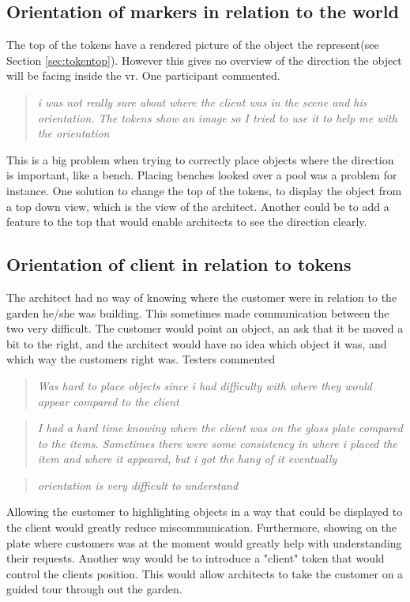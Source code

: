 \subsection*{Orientation of markers in relation to the world}
The top of the tokens have a rendered picture of the object the represent(see Section \ref{sec:tokentop}). However this gives no overview of the direction the object will be facing inside the vr. One participant commented.  
\\
\begin{quote}
\textit{i was not really sure about where the client was in the scene and his orientation. The tokens show an image so I tried to use it to help me with the orientation\\}
\end{quote}
This is a big problem when trying to correctly place objects where the direction is important, like a bench. Placing benches looked over a pool was a problem for instance. One solution to change the top of the tokens, to display the object from a top down view, which is the view of the architect. Another could be to add a feature to the top that would enable architects to see the direction clearly.

\subsection*{Orientation of client in relation to tokens}
The architect had no way of knowing where the customer were in relation to the garden he/she was building. This sometimes made communication between the two very difficult. The customer would point an object, an ask that it be moved a bit to the right, and the architect would have no idea which object it was, and which way the customers right was. Testers commented\\
\begin{quote}
	\textit{Was hard to place objects since i had difficulty with where they would appear compared to the client\\}
\end{quote}

\begin{quote}
	\textit{I had a hard time knowing where the client was on the glass plate compared to the items. Sometimes there were some consistency in where i placed the item and where it appeared, but i got the hang of it eventually\\}
\end{quote}

\begin{quote}
	\textit{orientation is very difficult to understand\\}
\end{quote}
 Allowing the customer to  highlighting objects in a way that could be displayed to the client would greatly reduce miscommunication. Furthermore, showing on the plate where customers was at the moment would greatly help with understanding their requests. Another way would be to introduce a "client" token that would control the clients position. This would allow architects to take the customer on a guided tour through out the garden.
